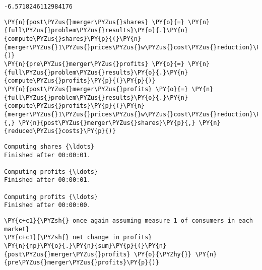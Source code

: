             \begin{tcolorbox}[breakable, size=fbox, boxrule=.5pt, pad at break*=1mm, opacityfill=0]
\begin{Verbatim}[commandchars=\\\{\}]
-6.5718246112984176
\end{Verbatim}
\end{tcolorbox}

    \begin{tcolorbox}[breakable, size=fbox, boxrule=1pt, pad at break*=1mm,colback=cellbackground, colframe=cellborder]
\begin{Verbatim}[commandchars=\\\{\}]
\PY{n}{post\PYZus{}merger\PYZus{}shares} \PY{o}{=} \PY{n}{full\PYZus{}problem\PYZus{}results}\PY{o}{.}\PY{n}{compute\PYZus{}shares}\PY{p}{(}\PY{n}{merger\PYZus{}1\PYZus{}prices\PYZus{}w\PYZus{}cost\PYZus{}reduction}\PY{p}{)}
\PY{n}{pre\PYZus{}merger\PYZus{}profits} \PY{o}{=} \PY{n}{full\PYZus{}problem\PYZus{}results}\PY{o}{.}\PY{n}{compute\PYZus{}profits}\PY{p}{(}\PY{p}{)}
\PY{n}{post\PYZus{}merger\PYZus{}profits} \PY{o}{=} \PY{n}{full\PYZus{}problem\PYZus{}results}\PY{o}{.}\PY{n}{compute\PYZus{}profits}\PY{p}{(}\PY{n}{merger\PYZus{}1\PYZus{}prices\PYZus{}w\PYZus{}cost\PYZus{}reduction}\PY{p}{,} \PY{n}{post\PYZus{}merger\PYZus{}shares}\PY{p}{,} \PY{n}{reduced\PYZus{}costs}\PY{p}{)}
\end{Verbatim}
\end{tcolorbox}

    \begin{Verbatim}[commandchars=\\\{\}]
Computing shares {\ldots}
Finished after 00:00:01.

Computing profits {\ldots}
Finished after 00:00:01.

Computing profits {\ldots}
Finished after 00:00:00.

    \end{Verbatim}

    \begin{tcolorbox}[breakable, size=fbox, boxrule=1pt, pad at break*=1mm,colback=cellbackground, colframe=cellborder]
\begin{Verbatim}[commandchars=\\\{\}]
\PY{c+c1}{\PYZsh{} once again assuming measure 1 of consumers in each market}
\PY{c+c1}{\PYZsh{} net change in profits}
\PY{n}{np}\PY{o}{.}\PY{n}{sum}\PY{p}{(}\PY{n}{post\PYZus{}merger\PYZus{}profits} \PY{o}{\PYZhy{}} \PY{n}{pre\PYZus{}merger\PYZus{}profits}\PY{p}{)}
\end{Verbatim}
\end{tcolorbox}

